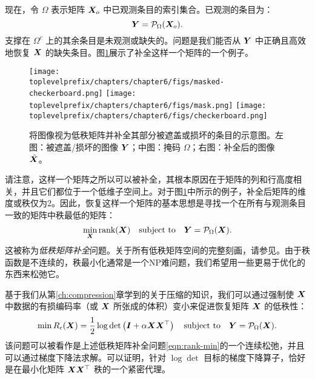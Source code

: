 \documentclass[../../book-main.tex]{subfiles}
\begin{document}
现在，令 $\Omega$ 表示矩阵 $\bm{X}_o$ 中已观测条目的索引集合。已观测的条目为：
\begin{equation}
\bm{Y} = \mathcal{P}_{\Omega}(\bm{X}_o).
\end{equation}
支撑在 $\Omega^c$ 上的其余条目是未观测或缺失的。问题是我们能否从 $\bm{Y}$ 中正确且高效地恢复 $\bm{X}$ 的缺失条目。图\ref{fig:matrix-completion}展示了补全这样一个矩阵的一个例子。

\begin{figure}
\centering
\texttt{[image: \\toplevelprefix/chapters/chapter6/figs/masked-checkerboard.png]}\;\;
\texttt{[image: \\toplevelprefix/chapters/chapter6/figs/mask.png]}\;\;
\texttt{[image: \\toplevelprefix/chapters/chapter6/figs/checkerboard.png]}
\caption{将图像视为低秩矩阵并补全其部分被遮盖或损坏的条目的示意图。左图：被遮盖/损坏的图像 $\bm{Y}$；中图：掩码 $\Omega$；右图：补全后的图像 $\hat {\bm{X}}$。}
\label{fig:matrix-completion}
\end{figure}

请注意，这样一个矩阵之所以可以被补全，其根本原因在于矩阵的列和行高度相关，并且它们都位于一个低维子空间上。对于图\ref{fig:matrix-completion}中所示的例子，补全后矩阵的维度或秩仅为2。因此，恢复这样一个矩阵的基本思想是寻找一个在所有与观测条目一致的矩阵中秩最低的矩阵：
\begin{equation}
\min_{\bm{X}} \mbox{rank}(\bm{X}) \quad \mbox{subject to}
\quad
\bm{Y} = \mathcal{P}_{\Omega}(\bm{X}).
\label{eqn:rank-min}
\end{equation}
这被称为{\em 低秩矩阵补全}问题。关于所有低秩矩阵空间的完整刻画，请参见\cite{Wright-Ma-2022}。由于秩函数是不连续的，秩最小化通常是一个NP难问题，我们希望用一些更易于优化的东西来松弛它。

基于我们从第\ref{ch:compression}章学到的关于压缩的知识，我们可以通过强制使 $\bm{X}$ 中数据的有损编码率（或 $\bm{X}$ 所张成的体积）变小来促进恢复矩阵 $\bm{X}$ 的低秩性：
\begin{equation}
\min R_\epsilon(\bm{X}) = \frac{1}{2} \log \det \left(\boldsymbol{I} +
\alpha  \bm{X}\bm{X}^\top \right) \quad \mbox{subject to}
\quad
\bm{Y} = \mathcal{P}_{\Omega}(\bm{X}).
\label{eqn:rate-min}
\end{equation}
该问题可以被看作是上述低秩矩阵补全问题\eqref{eqn:rank-min}的一个连续松弛，并且可以通过梯度下降法求解。可以证明，针对 $\log\det$ 目标的梯度下降算子，恰好是在最小化矩阵 $\bm{X}\bm{X}^\top$ 秩的一个紧密代理。
\end{document}
